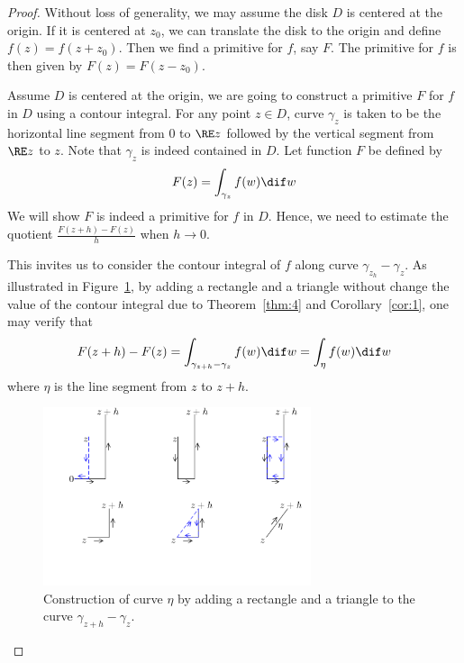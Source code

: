 \documentclass[thmcnt=section, color=cyan, 12pt]{my-elegantbook}
\begin{document}
\begin{proof}
    Without loss of generality, we may assume the disk $D$ is centered at the origin.
    If it is centered at $z_0$,
    we can translate the disk to the origin and define $f(z) = f(z + z_0)$.
    Then we find a primitive for $f$, say $F$.
    The primitive for $f$ is then given by $F(z) = F(z - z_0)$.

    Assume $D$ is centered at the origin,
    we are going to construct a primitive $F$ for $f$ in $D$
    using a contour integral.
    For any point $z \in D$,
    curve $\gamma_z$ is taken to be the horizontal line segment
    from $0$ to $\RE z$
    followed by the vertical segment from $\RE z$ to $z$.
    Note that $\gamma_z$ is indeed contained in $D$.
    Let function $F$ be defined by
    \begin{align*}
        F(z) = \int_{\gamma_z} f(w) \dif w
    \end{align*}
    We will show $F$ is indeed a primitive for $f$ in $D$.
    Hence, we need to estimate the quotient $\frac{F(z+h) - F(z)}{h}$ when $h \to 0$.

    This invites us to consider the contour integral of $f$ along curve $\gamma_{z_h} - \gamma_z$. As illustrated in Figure~\ref{fig:1},
    by adding a rectangle and a triangle without change the value of the contour integral
    due to Theorem~\ref{thm:4} and Corollary~\ref{cor:1}, one may verify that
    \begin{align}
        F(z+h) - F(z)
        = \int_{\gamma_{z+h} - \gamma_z} f(w) \dif w
        = \int_\eta f(w) \dif w
        \label{eq:6}
    \end{align}
    where $\eta$ is the line segment from $z$ to $z+h$.

    \begin{figure}[H]
        \centering
        \includegraphics[width=0.7\textwidth]{figures/adding-a-rectangle-and-a-triangle.png}
        \caption{Construction of curve $\eta$ by adding a rectangle and a triangle to the curve $\gamma_{z+h} - \gamma_z$.}
        \label{fig:1}
    \end{figure}


\end{proof}
\end{document}
